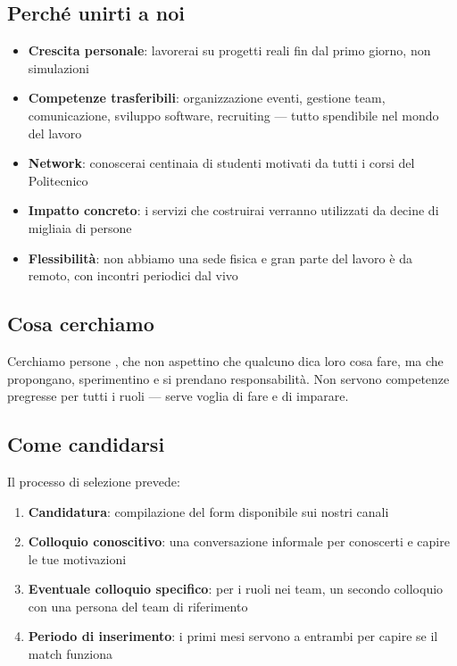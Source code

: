 \documentclass[report]{polinetwork}
\begin{document}
\subsection{Perché unirti a noi}

\begin{itemize}
  \item \textbf{Crescita personale}: lavorerai su progetti reali
    fin dal primo giorno, non simulazioni
  \item \textbf{Competenze trasferibili}: organizzazione eventi,
    gestione team, comunicazione, sviluppo software, recruiting
    --- tutto spendibile nel mondo del lavoro
  \item \textbf{Network}: conoscerai centinaia di studenti
    motivati da tutti i corsi del Politecnico
  \item \textbf{Impatto concreto}: i servizi che costruirai
    verranno utilizzati da decine di migliaia di persone
  \item \textbf{Flessibilità}: non abbiamo una sede fisica e gran
    parte del lavoro è da remoto, con incontri periodici
    dal vivo
\end{itemize}

\subsection{Cosa cerchiamo}

Cerchiamo persone , che non aspettino che qualcuno
dica loro cosa fare, ma che propongano, sperimentino e si prendano
responsabilità. Non servono competenze pregresse per tutti i ruoli
--- serve voglia di fare e di imparare.

\subsection{Come candidarsi}

Il processo di selezione prevede:

\begin{enumerate}
  \item \textbf{Candidatura}: compilazione del form disponibile
    sui nostri canali
  \item \textbf{Colloquio conoscitivo}: una conversazione informale
    per conoscerti e capire le tue motivazioni
  \item \textbf{Eventuale colloquio specifico}: per i ruoli nei
    team, un secondo colloquio con una persona del team
    di riferimento
  \item \textbf{Periodo di inserimento}: i primi mesi servono a
    entrambi per capire se il match funziona
\end{enumerate}
\end{document}
